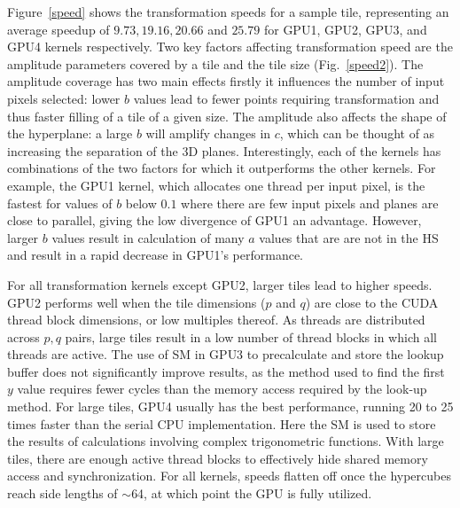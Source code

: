 Figure~\ref{speed} shows the transformation speeds for a sample tile, representing an average speedup of $9.73, 19.16, 20.66$ and $25.79$ for GPU1, GPU2, GPU3, and GPU4  kernels respectively. Two key factors affecting transformation speed are the amplitude parameters covered by a tile and the tile size (Fig.~\ref{speed2}). The amplitude coverage has two main effects firstly it influences the number of input pixels selected: lower $b$ values lead to fewer points requiring transformation and thus faster filling of a tile of a given size. The amplitude also affects the shape of the hyperplane: a large $b$ will amplify changes in $c$, which can be thought of as increasing the separation of the 3D planes. Interestingly, each of the kernels has combinations of the two factors for which it outperforms the other kernels. For example, the GPU1 kernel, which allocates one thread per input pixel, is the fastest for values of $b$ below $0.1$ where there are few input pixels and planes are close to parallel, giving the low divergence of GPU1 an advantage. However, larger $b$ values result in  calculation of many $a$ values that are are not in the HS and result in a rapid decrease in GPU1's performance.

For all transformation kernels except GPU2, larger tiles lead to higher speeds. GPU2 performs well when the tile dimensions ($p$ and $q$) are close to the CUDA thread block dimensions, or low multiples thereof. As threads are distributed across $p,q$ pairs, large tiles result in a low number of thread blocks in which all threads are active. The use of SM in GPU3 to precalculate and store the lookup buffer does not significantly improve results, as the method used to find the first $y$ value requires fewer cycles than the memory access required by the look-up method. For large tiles, GPU4 usually has the best performance, running  20 to 25 times faster than the serial CPU implementation. Here the SM is used to store the results of calculations involving complex trigonometric functions. With large tiles, there are enough active thread blocks to effectively hide shared memory access and synchronization. For all kernels, speeds flatten off once the hypercubes reach side lengths of $\sim$64, at which point the GPU is fully utilized.

